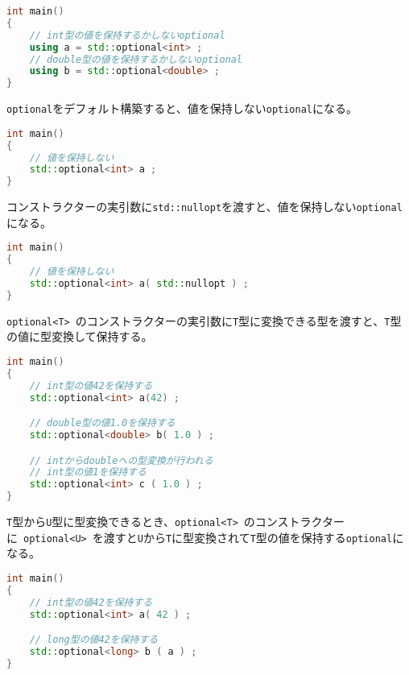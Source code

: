 \begin{lstlisting}[language=C++]
int main()
{
    // int型の値を保持するかしないoptional
    using a = std::optional<int> ;
    // double型の値を保持するかしないoptional
    using b = std::optional<double> ;
}
\end{lstlisting}

%

\lstinline!optional!をデフォルト構築すると、値を保持しない\lstinline!optional!になる。

\begin{lstlisting}[language=C++]
int main()
{
    // 値を保持しない
    std::optional<int> a ;
}
\end{lstlisting}

コンストラクターの実引数に\lstinline!std::nullopt!を渡すと、値を保持しない\lstinline!optional!になる。

\begin{lstlisting}[language=C++]
int main()
{
    // 値を保持しない
    std::optional<int> a( std::nullopt ) ;
}
\end{lstlisting}

\lstinline!optional<T>!~のコンストラクターの実引数に\lstinline!T!型に変換できる型を渡すと、\lstinline!T!型の値に型変換して保持する。

\begin{lstlisting}[language=C++]
int main()
{
    // int型の値42を保持する
    std::optional<int> a(42) ;

    // double型の値1.0を保持する
    std::optional<double> b( 1.0 ) ;

    // intからdoubleへの型変換が行われる
    // int型の値1を保持する
    std::optional<int> c ( 1.0 ) ;
}
\end{lstlisting}

\lstinline!T!型から\lstinline!U!型に型変換できるとき、\lstinline!optional<T>!~のコンストラクターに~\lstinline!optional<U>!~を渡すと\lstinline!U!から\lstinline!T!に型変換されて\lstinline!T!型の値を保持する\lstinline!optional!になる。

\begin{lstlisting}[language=C++]
int main()
{
    // int型の値42を保持する
    std::optional<int> a( 42 ) ;

    // long型の値42を保持する
    std::optional<long> b ( a ) ;
}
\end{lstlisting}

